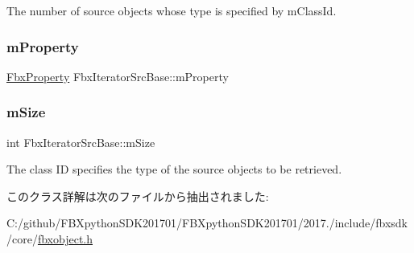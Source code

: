 The number of source objects whose type is specified by m\+Class\+Id. 

\mbox{\label{class_fbx_iterator_src_base_aa07b855d779bd7b3383ef7a41dbab232}} 
\subsubsection{\texorpdfstring{m\+Property}{mProperty}}
{\footnotesize\ttfamily \hyperlink{class_fbx_property}{Fbx\+Property} Fbx\+Iterator\+Src\+Base\+::m\+Property\hspace{0.3cm}{\ttfamily [protected]}}

\mbox{\label{class_fbx_iterator_src_base_a267938478933f2405b32bf9722648d36}} 
\subsubsection{\texorpdfstring{m\+Size}{mSize}}
{\footnotesize\ttfamily int Fbx\+Iterator\+Src\+Base\+::m\+Size\hspace{0.3cm}{\ttfamily [protected]}}



The class ID specifies the type of the source objects to be retrieved. 



このクラス詳解は次のファイルから抽出されました\+:\begin{DoxyCompactItemize}
\item 
C\+:/github/\+F\+B\+Xpython\+S\+D\+K201701/\+F\+B\+Xpython\+S\+D\+K201701/2017./include/fbxsdk/core/\hyperlink{fbxobject_8h}{fbxobject.\+h}\end{DoxyCompactItemize}
